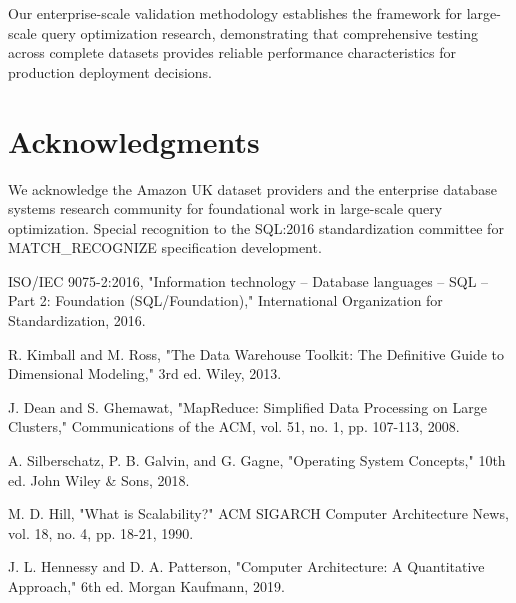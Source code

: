 \documentclass[conference]{IEEEtran}
\begin{document}
Our enterprise-scale validation methodology establishes the framework for large-scale query optimization research, demonstrating that comprehensive testing across complete datasets provides reliable performance characteristics for production deployment decisions.

\section*{Acknowledgments}

We acknowledge the Amazon UK dataset providers and the enterprise database systems research community for foundational work in large-scale query optimization. Special recognition to the SQL:2016 standardization committee for MATCH\_RECOGNIZE specification development.

\begin{thebibliography}{00}
 ISO/IEC 9075-2:2016, "Information technology -- Database languages -- SQL -- Part 2: Foundation (SQL/Foundation)," International Organization for Standardization, 2016.

 R. Kimball and M. Ross, "The Data Warehouse Toolkit: The Definitive Guide to Dimensional Modeling," 3rd ed. Wiley, 2013.

 J. Dean and S. Ghemawat, "MapReduce: Simplified Data Processing on Large Clusters," Communications of the ACM, vol. 51, no. 1, pp. 107-113, 2008.

 A. Silberschatz, P. B. Galvin, and G. Gagne, "Operating System Concepts," 10th ed. John Wiley \& Sons, 2018.

 M. D. Hill, "What is Scalability?" ACM SIGARCH Computer Architecture News, vol. 18, no. 4, pp. 18-21, 1990.

 J. L. Hennessy and D. A. Patterson, "Computer Architecture: A Quantitative Approach," 6th ed. Morgan Kaufmann, 2019.
\end{thebibliography}
\end{document}
